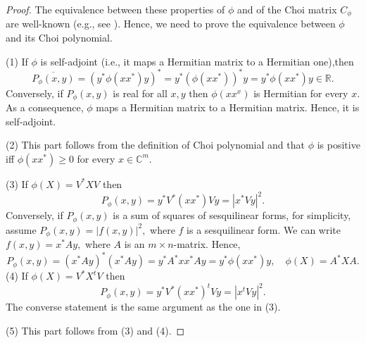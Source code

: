 \documentclass[12pt,a4paper]{amsart}
\theoremstyle{plain}
\theoremstyle{remark}
\theoremstyle{definition}
\def \R {\mathbb{R}}
\def \C {\mathbb{C}}
\begin{document}
\begin{proof} The equivalence between these properties of $\phi$ and of the Choi matrix $C_{\phi}$ are well-known (e.g., see \cite[Section 3.3]{OsakaBook24}). Hence, we need to prove the equivalence between $\phi$ and its Choi polynomial. 
	
(1) If $\phi$ is self-adjoint (i.e., it maps a Hermitian matrix to a Hermitian one),then 
	$$ 
\overline{P_{\phi}(x,y)} = (y^*\phi(xx^*)y)^* = y^* (\phi(xx^*))^*y = y^*\phi(xx^*)y \in \R.
	$$
Conversely, if $P_{\phi}(x,y)$ is real for all $x,y$ then $\phi(xx^x)$ is Hermitian for every $x.$ As a consequence, $\phi$ maps a Hermitian matrix to a Hermitian matrix. Hence, it is self-adjoint.
 
(2) This part follows from the definition of Choi polynomial and that $\phi$ is positive iff $\phi(xx^*) \ge 0$ for every $x\in \C^m.$
	
(3) If $\phi (X) = V^* X V$ then 
$$
P_{\phi}(x,y)   =  y^* V^*(xx^*)V y  = |x^*Vy|^2.   
$$
Conversely, if $P_{\phi}(x,y)$ is a sum of squares of sesquilinear forms, for simplicity, assume $P_{\phi}(x,y) = |f(x,y)|^2,$ where $f$ is a sesquilinear form. We can write 
$f(x,y) = x^*Ay,$ where $A$ is an $m\times n$-matrix. Hence,
$$
P_{\phi}(x,y) = (x^*Ay)^*(x^*Ay) = y^*A^*xx^*Ay = y^*\phi(xx^*)y, \quad  \phi (X) = A^*XA.
$$ 
\quad (4) If $\phi (X) = V^* X^t V$ then 
$$
P_{\phi}(x,y)   =  y^* V^*(xx^*)^tV y  = |x^tVy|^2.   
$$
The converse statement is the same argument as the one in (3).

(5) This part follows from (3) and (4). 
\end{proof}
\end{document}
